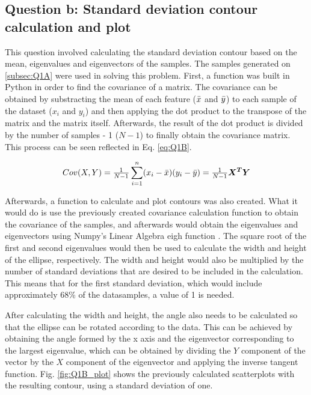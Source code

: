 \documentclass{article}
\begin{document}
\subsection{Question b: Standard deviation contour calculation and plot}
\label{subsec:Q1B}
This question involved calculating the standard deviation contour based on the mean, eigenvalues and eigenvectors of the samples. The samples generated on \ref{subsec:Q1A} were used in solving this problem. First, a function was built in Python in order to find the covariance of a matrix. The covariance can be obtained by substracting the mean  of each feature ($\Bar{x}$ and $\Bar{y}$) to each sample of the dataset ($x_i$ and $y_i$) and then applying the dot product to the transpose of the matrix and the matrix itself. Afterwards, the result of the dot product is divided by the number of samples - 1 ($N - 1$) to finally obtain the covariance matrix\cite{Cov_Calculation}. This process can be seen reflected in Eq. \ref{eq:Q1B}.

\begin{gather}\label{eq:Q1B}
Cov (X,Y) = \tfrac{1}{N - 1} \sum_{i=1}^{n}(x_i - \Bar{x})(y_i - \Bar{y}) = \tfrac{1}{N - 1} \boldsymbol{X^T}\boldsymbol{Y}
\end{gather}

Afterwards, a function to calculate and plot contours was also created. What it would do is use the previously created covariance calculation function to obtain the covariance of the samples, and afterwards would obtain the eigenvalues and eigenvectors using Numpy's Linear Algebra eigh function \cite{Numpy_LinAlg_Eigh}. The square root of the first and second eigenvalues would then be used to calculate the width and height of the ellipse, respectively. The width and height would also be multiplied by the number of standard deviations that are desired to be included in the calculation. This means that for the first standard deviation, which would include approximately 68\% of the datasamples, a value of 1 is needed.

After calculating the width and height, the angle also needs to be calculated so that the ellipse can be rotated according to the data. This can be achieved by obtaining the angle formed by the x axis and the eigenvector corresponding to the largest eigenvalue, which can be obtained by dividing the $Y$ component of the vector by the $X$ component of the eigenvector and applying the inverse tangent function. Fig. \ref{fig:Q1B_plot} shows the previously calculated scatterplots with the resulting contour, using a standard deviation of one.
\end{document}
